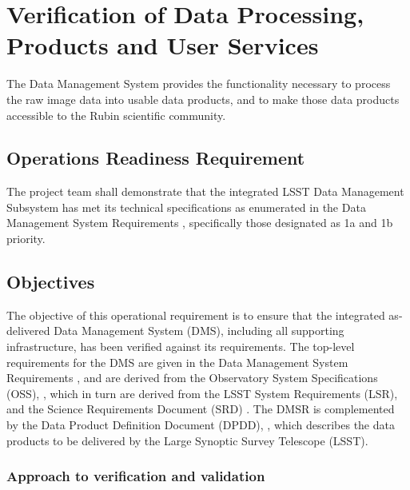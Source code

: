 

\section{Verification of Data Processing, Products and User Services}  \label{sec:dm}

The Data Management System provides the functionality necessary to process the raw image data into usable data products, and to make those data products accessible to the Rubin scientific community.

\subsection{Operations Readiness Requirement}
The project team shall demonstrate that the integrated LSST Data Management Subsystem has met its technical specifications as enumerated in the  Data Management System Requirements  , specifically those designated as 1a and 1b priority.

\subsection{Objectives}
The objective of this operational requirement is to ensure that the integrated as-delivered Data Management System (DMS), including all supporting infrastructure, has been verified against its requirements.
The top-level requirements for the DMS are given in the Data Management System Requirements  , and are derived from the Observatory System Specifications (OSS), , which in turn are derived from the LSST System Requirements (LSR),  and the Science Requirements Document (SRD) .
The DMSR is complemented by the Data Product Definition Document (DPDD), ,  which describes the data products to be delivered by the Large Synoptic Survey Telescope (LSST).

\subsubsection{Approach to verification and validation}\label{sec:dm-approach}

